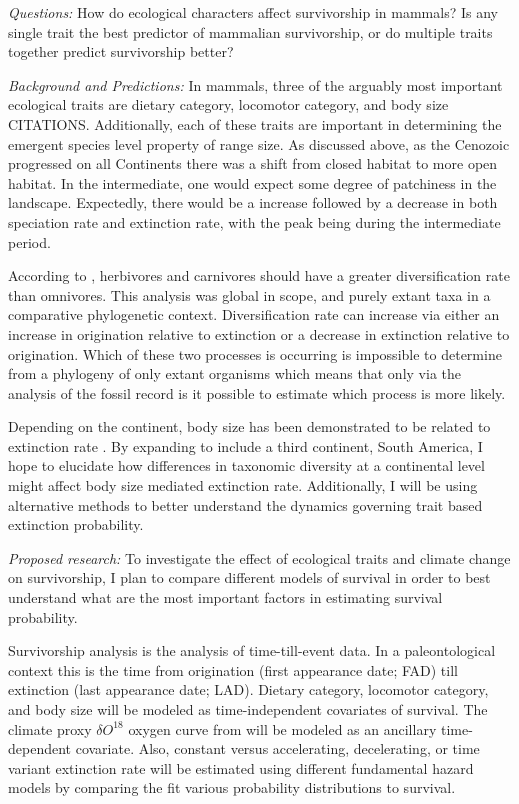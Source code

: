 \documentclass[12pt,letterpaper]{article}
\begin{document}
\textit{Questions:} How do ecological characters affect survivorship in mammals? Is any single trait the best predictor of mammalian survivorship, or do multiple traits together predict survivorship better?

\textit{Background and Predictions:} 
In mammals, three of the arguably most important ecological traits are dietary category, locomotor category, and body size CITATIONS. Additionally, each of these traits are important in determining the emergent species level property of range size. As discussed above, as the Cenozoic progressed on all Continents there was a shift from closed habitat to more open habitat. In the intermediate, one would expect some degree of patchiness in the landscape. Expectedly, there would be a increase followed by a decrease in both speciation rate and extinction rate, with the peak being during the intermediate period.

According to \citet{Price2012}, herbivores and carnivores should have a greater diversification rate than omnivores. This analysis was global in scope, and purely extant taxa in a comparative phylogenetic context. Diversification rate can increase via either an increase in origination relative to extinction or a decrease in extinction relative to origination. Which of these two processes is occurring is impossible to determine from a phylogeny of only extant organisms \citep{Rabosky2010a} which means that only via the analysis of the fossil record is it possible to estimate which process is more likely. 

Depending on the continent, body size has been demonstrated to be related to extinction rate \citep{Tomiya2013,Liow2008,Liow2009}. By expanding to include a third continent, South America, I hope to elucidate how differences in taxonomic diversity at a continental level might affect body size mediated extinction rate. Additionally, I will be using alternative methods to better understand the dynamics governing trait based extinction probability.

\textit{Proposed research:}
To investigate the effect of ecological traits and climate change on survivorship, I plan to compare different models of survival in order to best understand what are the most important factors in estimating survival probability.

Survivorship analysis is the analysis of time-till-event data. In a paleontological context this is the time from origination (first appearance date; FAD) till extinction (last appearance date; LAD). Dietary category, locomotor category, and body size will be modeled as time-independent covariates of survival. The climate proxy \(\delta O^{18}\) oxygen curve from \citet{Zachos2008} will be modeled as an ancillary time-dependent covariate. Also, constant versus accelerating, decelerating, or time variant extinction rate will be estimated using different fundamental hazard models by comparing the fit various probability distributions to survival.
\end{document}
